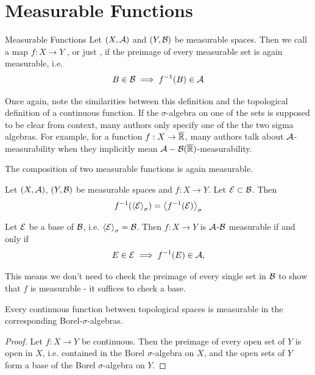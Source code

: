 \chapter{Measurable Functions}
\begin{importantdefinition}{Measurable Functions}{}
	Let $(X, \mathcal{A})$ and $(Y, \mathcal{B})$ be measurable spaces. Then we call a map $f : X \to Y$ , or just , if the preimage of every measurable set is again measurable, i.e.
	\begin{align*}
		B \in \mathcal{B} \implies f^{-1}(B) \in \mathcal{A}
	\end{align*}
\end{importantdefinition}
Once again, note the similarities between this definition and the topological definition of a continuous function. 
\newpar
If the $\sigma$-algebra on one of the sets is supposed to be clear from context, many authors only specify one of the the two sigma algebras. For example, for a function $f : X \to \overline{{\mathbb{R}}}$, many authors talk about $\mathcal{A}$-measurability when they implicitly mean $\mathcal{A}-\mathcal{B}(\overline{{\mathbb{R}}})$-measurability.
\begin{importantcorollary}{}{}
	The composition of two measurable functions is again measurable.
\end{importantcorollary}
\begin{lemma}
	Let $(X, \mathcal{A})$, $(Y, \mathcal{B})$ be measurable spaces and $f : X \to Y$. Let $\mathcal{E} \subset \mathcal{B}$. Then
	\begin{align*}
		f^{-1}(\left\langle \mathcal{E} \right\rangle_\sigma) = \left\langle f^{-1}(\mathcal{E}) \right\rangle_\sigma
	\end{align*}
\end{lemma}
\begin{importantcorollary}{}{}
	Let $\mathcal{E}$ be a base of $\mathcal{B}$, i.e. $\left\langle \mathcal{E} \right\rangle_\sigma = \mathcal{B}$. Then $f : X \to Y$ is $\mathcal{A}$-$\mathcal{B}$ measurable if and only if 
	\begin{align*}
		E \in \mathcal{E} \implies f^{-1}(E) \in \mathcal{A},
	\end{align*}
\end{importantcorollary}
This means we don't need to check the preimage of every single set in $\mathcal{B}$ to show that $f$ is measurable - it suffices to check a base.
\begin{corollary}
	Every continuous function between topological spaces is measurable in the corresponding Borel-$\sigma$-algebras.
\end{corollary}
\begin{proof}
	Let $f : X \to Y$ be continuous. Then the preimage of every open set of $Y$ is open in $X$, i.e. contained in the Borel $\sigma$-algebra on $X$, and the open sets of $Y$ form a base of the Borel $\sigma$-algebra on $Y$.
\end{proof}
